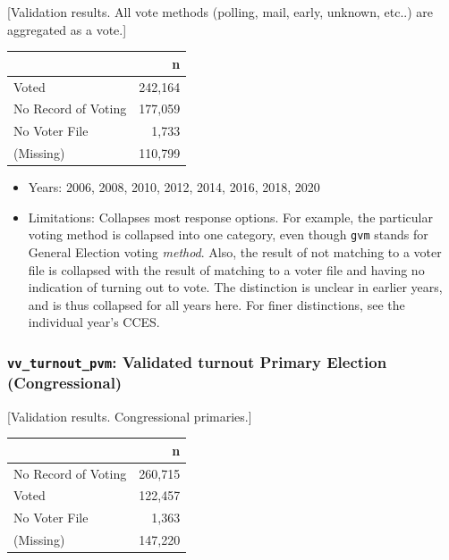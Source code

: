 \documentclass[10pt,article,oneside]{memoir}
\theoremstyle{definition}
\begin{document}
{[}Validation results. All vote methods (polling, mail, early, unknown,
etc..) are aggregated as a vote.{]}

\begin{table}[H]
\centering
\begin{tabular}[t]{lr}
\toprule
 & n\\
\midrule
Voted & 242,164\\
No Record of Voting & 177,059\\
No Voter File & 1,733\\
(Missing) & 110,799\\
\bottomrule
\end{tabular}
\end{table}

\begin{itemize}
\tightlist
\item
  Years: 2006, 2008, 2010, 2012, 2014, 2016, 2018, 2020
\item
  Limitations: Collapses most response options. For example, the
  particular voting method is collapsed into one category, even though
  \texttt{gvm} stands for General Election voting \emph{method}. Also,
  the result of not matching to a voter file is collapsed with the
  result of matching to a voter file and having no indication of turning
  out to vote. The distinction is unclear in earlier years, and is thus
  collapsed for all years here. For finer distinctions, see the
  individual year's CCES.
\end{itemize}

\hypertarget{vv_turnout_pvm-validated-turnout-primary-election-congressional}{%
\subsubsection{\texorpdfstring{\texttt{vv\_turnout\_pvm}: Validated
turnout Primary Election
(Congressional)}{vv\_turnout\_pvm: Validated turnout Primary Election (Congressional)}}\label{vv_turnout_pvm-validated-turnout-primary-election-congressional}}

{[}Validation results. Congressional primaries.{]}

\begin{table}[H]
\centering
\begin{tabular}[t]{lr}
\toprule
 & n\\
\midrule
No Record of Voting & 260,715\\
Voted & 122,457\\
No Voter File & 1,363\\
(Missing) & 147,220\\
\bottomrule
\end{tabular}
\end{table}
\end{document}
